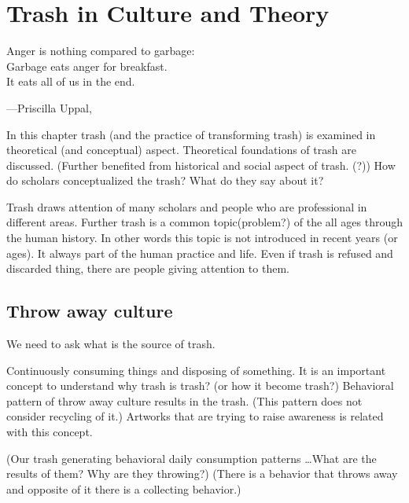 \chapter{Trash in Culture and Theory}

\epigraph{Anger is nothing compared to garbage:\\ Garbage eats anger for breakfast.\\ It eats all of us in the end.}{\hfill---Priscilla Uppal, }

In this chapter trash (and the practice of transforming trash) is examined in theoretical (and conceptual) aspect. Theoretical foundations of trash are discussed. (Further benefited from historical and social aspect of trash. (?)) How do scholars conceptualized the trash? What do they say about it? 

Trash draws attention of many scholars and people who are professional in different areas. Further trash is a common topic(problem?) of the all ages through the human history. In other words this topic is not introduced in recent years (or ages). It always part of the human practice and life. Even if trash is refused and discarded thing, there are people giving attention to them.


\section{Throw away culture}
We need to ask what is the source of trash.

Continuously consuming things and disposing of something. It is an important concept to understand why trash is trash? (or how it become trash?) Behavioral pattern of throw away culture results in the trash. (This pattern does not consider recycling of it.) Artworks that are trying to raise awareness is related with this concept.

(Our trash generating behavioral daily consumption patterns \ldots What are the results of them? Why are they throwing?) (There is a behavior that throws away and opposite of it there is a collecting behavior.) 


